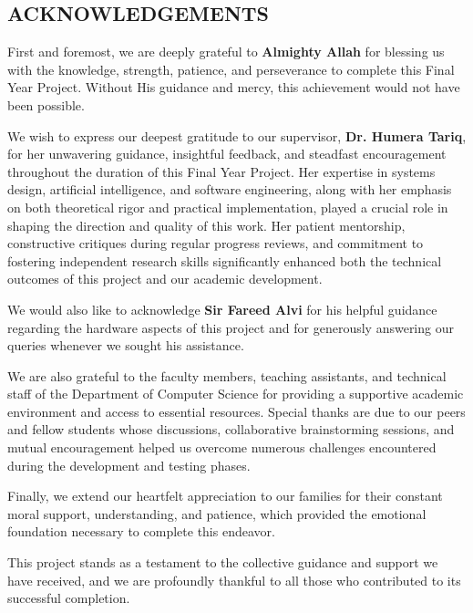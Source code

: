 \thispagestyle{plain}
\renewcommand{\baselinestretch}{1}\small\normalsize
\begin{center}
\section*{\centering ACKNOWLEDGEMENTS}
\end{center}
\justify
First and foremost, we are deeply grateful to \textbf{Almighty Allah} for blessing us with the knowledge, strength, patience, and perseverance to complete this Final Year Project. Without His guidance and mercy, this achievement would not have been possible.

We wish to express our deepest gratitude to our supervisor, \textbf{Dr. Humera Tariq}, for her unwavering guidance, insightful feedback, and steadfast encouragement throughout the duration of this Final Year Project. Her expertise in systems design, artificial intelligence, and software engineering, along with her emphasis on both theoretical rigor and practical implementation, played a crucial role in shaping the direction and quality of this work. Her patient mentorship, constructive critiques during regular progress reviews, and commitment to fostering independent research skills significantly enhanced both the technical outcomes of this project and our academic development.

We would also like to acknowledge \textbf{Sir Fareed Alvi} for his helpful guidance regarding the hardware aspects of this project and for generously answering our queries whenever we sought his assistance.

We are also grateful to the faculty members, teaching assistants, and technical staff of the Department of Computer Science for providing a supportive academic environment and access to essential resources. Special thanks are due to our peers and fellow students whose discussions, collaborative brainstorming sessions, and mutual encouragement helped us overcome numerous challenges encountered during the development and testing phases.

Finally, we extend our heartfelt appreciation to our families for their constant moral support, understanding, and patience, which provided the emotional foundation necessary to complete this endeavor.

This project stands as a testament to the collective guidance and support we have received, and we are profoundly thankful to all those who contributed to its successful completion.
\newpage